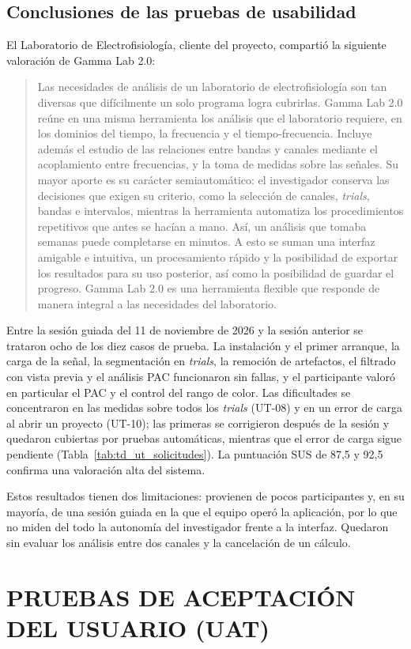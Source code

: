 \documentclass[12pt,letterpaper,oneside]{article}
\DeclareRobustCommand{\_}{\textunderscore\allowbreak}
\newcommand{\fechasesion}{11 de noviembre de 2026}
\newcommand{\capitulo}[1]{\clearpage\section{#1}}
\begin{document}
\subsection{Conclusiones de las pruebas de usabilidad}
El Laboratorio de Electrofisiología, cliente del proyecto, compartió la siguiente valoración de Gamma Lab 2.0:

\begin{quote}
Las necesidades de análisis de un laboratorio de electrofisiología son tan diversas que difícilmente un solo programa logra cubrirlas. Gamma Lab 2.0 reúne en una misma herramienta los análisis que el laboratorio requiere, en los dominios del tiempo, la frecuencia y el tiempo-frecuencia. Incluye además el estudio de las relaciones entre bandas y canales mediante el acoplamiento entre frecuencias, y la toma de medidas sobre las señales. Su mayor aporte es su carácter semiautomático: el investigador conserva las decisiones que exigen su criterio, como la selección de canales, \textit{trials}, bandas e intervalos, mientras la herramienta automatiza los procedimientos repetitivos que antes se hacían a mano. Así, un análisis que tomaba semanas puede completarse en minutos. A esto se suman una interfaz amigable e intuitiva, un procesamiento rápido y la posibilidad de exportar los resultados para su uso posterior, así como la posibilidad de guardar el progreso. Gamma Lab 2.0 es una herramienta flexible que responde de manera integral a las necesidades del laboratorio.
\end{quote}

Entre la sesión guiada del \fechasesion{} y la sesión anterior se trataron ocho de los diez casos de prueba. La instalación y el primer arranque, la carga de la señal, la segmentación en \textit{trials}, la remoción de artefactos, el filtrado con vista previa y el análisis PAC funcionaron sin fallas, y el participante valoró en particular el PAC y el control del rango de color. Las dificultades se concentraron en las medidas sobre todos los \textit{trials} (UT-08) y en un error de carga al abrir un proyecto (UT-10); las primeras se corrigieron después de la sesión y quedaron cubiertas por pruebas automáticas, mientras que el error de carga sigue pendiente (Tabla~\ref{tab:td_ut_solicitudes}). La puntuación SUS de 87,5 y 92,5 confirma una valoración alta del sistema.

Estos resultados tienen dos limitaciones: provienen de pocos participantes y, en su mayoría, de una sesión guiada en la que el equipo operó la aplicación, por lo que no miden del todo la autonomía del investigador frente a la interfaz. Quedaron sin evaluar los análisis entre dos canales y la cancelación de un cálculo.
\capitulo{PRUEBAS DE ACEPTACIÓN DEL USUARIO (UAT)}
\label{sec:td_uat}
\end{document}
